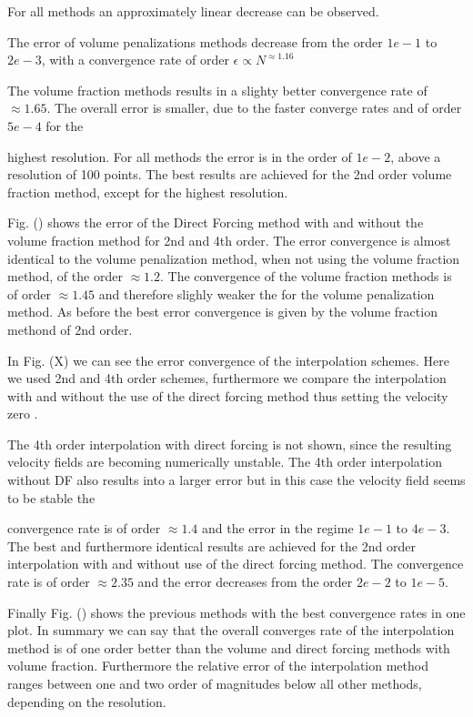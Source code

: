 For all methods an approximately linear decrease  can be observed.

The error of volume penalizations methods decrease from the order $1e-1$ to $2e-3$, with
a convergence rate of order  $\epsilon \propto N^{\approx1.16}$

The volume fraction methods results in a slighty better convergence rate of $\approx 1.65$.
The overall error is smaller, due to the faster converge rates and of order $5e-4$ for the

highest resolution. For all methods the error is in the order of $1e-2$, above a resolution of 100 points.
The best results are achieved for the 2nd order volume fraction method, except for the highest resolution.

Fig. () shows the error of the Direct Forcing method with and without the volume fraction method for 2nd
and 4th order. The error convergence is almost identical to the volume penalization method, when not using the volume
fraction method, of the order $\approx 1.2$. The convergence of the volume fraction methods is of order $\approx 1.45$
and therefore slighly weaker the for the volume penalization method.
As before the best error convergence is given by the volume fraction methond of 2nd order.

In Fig. (X) we can see the error convergence of the interpolation schemes.
Here we used 2nd and 4th order schemes, furthermore we compare the interpolation with and without the
use of the direct forcing method thus setting the velocity zero .

The 4th order interpolation with direct forcing is not shown, since the resulting velocity fields are becoming
numerically unstable. The 4th order interpolation without DF also results into a larger error but in this case
the velocity field seems to be stable the

convergence rate is of order $\approx 1.4$ and the error in the regime $1e-1$ to $4e-3$.
The best and furthermore identical results are achieved for the 2nd order interpolation with and without
use of the direct forcing method. The convergence rate is of order $\approx 2.35$ and the error
decreases from the order $2e-2$ to $1e-5$.

Finally Fig. () shows the previous methods with the best convergence rates in one plot.
In summary we can say that the overall converges rate of the interpolation method is of one order better
than the volume and direct forcing methods with volume fraction. Furthermore the relative error of the interpolation method ranges
between one and two order of magnitudes below all other methods, depending on the resolution.


